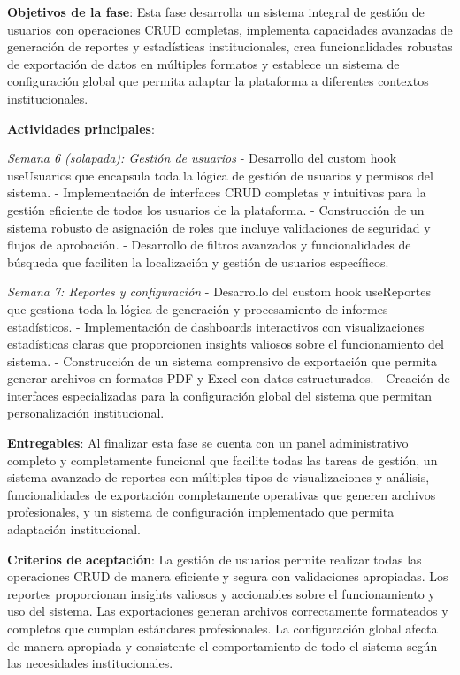 \documentclass[12pt,a4paper,oneside]{report}
\begin{document}
\textbf{Objetivos de la fase}: Esta fase desarrolla un sistema integral de gestión de usuarios con operaciones CRUD completas, implementa capacidades avanzadas de generación de reportes y estadísticas institucionales, crea funcionalidades robustas de exportación de datos en múltiples formatos y establece un sistema de configuración global que permita adaptar la plataforma a diferentes contextos institucionales.

\textbf{Actividades principales}:

\emph{Semana 6 (solapada): Gestión de usuarios} - Desarrollo del custom hook useUsuarios que encapsula toda la lógica de gestión de usuarios y permisos del sistema. - Implementación de interfaces CRUD completas y intuitivas para la gestión eficiente de todos los usuarios de la plataforma. - Construcción de un sistema robusto de asignación de roles que incluye validaciones de seguridad y flujos de aprobación. - Desarrollo de filtros avanzados y funcionalidades de búsqueda que faciliten la localización y gestión de usuarios específicos.

\emph{Semana 7: Reportes y configuración} - Desarrollo del custom hook useReportes que gestiona toda la lógica de generación y procesamiento de informes estadísticos. - Implementación de dashboards interactivos con visualizaciones estadísticas claras que proporcionen insights valiosos sobre el funcionamiento del sistema. - Construcción de un sistema comprensivo de exportación que permita generar archivos en formatos PDF y Excel con datos estructurados. - Creación de interfaces especializadas para la configuración global del sistema que permitan personalización institucional.

\textbf{Entregables}: Al finalizar esta fase se cuenta con un panel administrativo completo y completamente funcional que facilite todas las tareas de gestión, un sistema avanzado de reportes con múltiples tipos de visualizaciones y análisis, funcionalidades de exportación completamente operativas que generen archivos profesionales, y un sistema de configuración implementado que permita adaptación institucional.

\textbf{Criterios de aceptación}: La gestión de usuarios permite realizar todas las operaciones CRUD de manera eficiente y segura con validaciones apropiadas. Los reportes proporcionan insights valiosos y accionables sobre el funcionamiento y uso del sistema. Las exportaciones generan archivos correctamente formateados y completos que cumplan estándares profesionales. La configuración global afecta de manera apropiada y consistente el comportamiento de todo el sistema según las necesidades institucionales.
\end{document}
